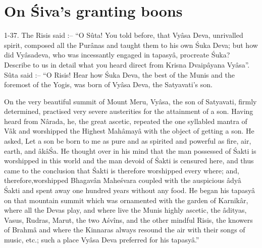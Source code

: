 \chapter{On \'Siva’s granting boons}

1-37. The Risis said :-- ``O S\^uta! You told before, that Vy\^asa Deva, unrivalled spirit, composed all the Pur\^anas and taught them to his own \'Suka Deva; but how did Vy\^asadeva, who was incessantly engaged in tapasy\^a, procreate \'Suka? Describe to us in detail what you heard direct from Krisna Dvaip\^ayana Vy\^asa''. S\^uta said :-- ``O Risis! Hear how \'Suka Deva, the best of the Munis and the foremost of the Yogis, was born of Vy\^asa Deva, the Satyavati's son.

On the very beautiful summit of Mount Meru, Vy\^asa, the son of Satyavati, firmly determined, practised very severe austerities for the attainment of a son. Having heard from N\^arada, he, the great ascetic, repeated the one syllabled mantra of V\^ak and worshipped the Highest Mah\^amay\^a with the object of getting a son. He asked, Let a son be born to me as pure and as spirited and powerful as fire, air, earth, and \^ak\^a\'Sa. He thought over in his mind that the man possessed of \'Sakti is worshipped in this world and the man devoid of \'Sakti is censured here, and thus came to the conclusion that \'Sakti is therefore worshipped every where; and, therefore,worshipped Bhagav\^an Mahe\'svara coupled with the auspicious \^ady\^a \'Sakti and spent away one hundred years without any food. He began his tapasy\^a on that mountain summit which was ornamented with the garden of Karnik\^ar, where all the Devas play, and where live the Munis highly ascetic, the \^adityas, Vasus, Rudras, Marut, the two A\'sv\^ins, and the other mindful Risis, the knowers of Brahm\^a and where the Kinnaras always resound the air with their songs of music, etc.; such a place Vy\^asa Deva preferred for his tapasy\^a.''

